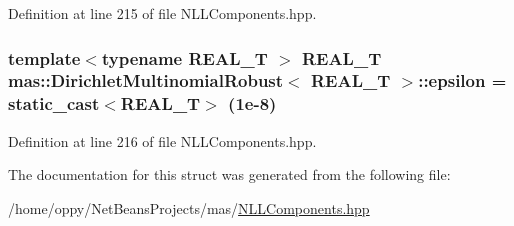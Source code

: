 Definition at line 215 of file N\-L\-L\-Components.\-hpp.

\hypertarget{structmas_1_1_dirichlet_multinomial_robust_a7f16f0414a3ad99ca01df8e9df5a0785}{
\subsubsection[{epsilon}]{\setlength{\rightskip}{0pt plus 5cm}template$<$typename R\-E\-A\-L\-\_\-\-T $>$ R\-E\-A\-L\-\_\-\-T {\bf mas\-::\-Dirichlet\-Multinomial\-Robust}$<$ R\-E\-A\-L\-\_\-\-T $>$\-::epsilon = static\-\_\-cast$<$R\-E\-A\-L\-\_\-\-T$>$ (1e-\/8)}}\label{structmas_1_1_dirichlet_multinomial_robust_a7f16f0414a3ad99ca01df8e9df5a0785}


Definition at line 216 of file N\-L\-L\-Components.\-hpp.



The documentation for this struct was generated from the following file\-:\begin{DoxyCompactItemize}
\item 
/home/oppy/\-Net\-Beans\-Projects/mas/\hyperlink{_n_l_l_components_8hpp}{N\-L\-L\-Components.\-hpp}\end{DoxyCompactItemize}
